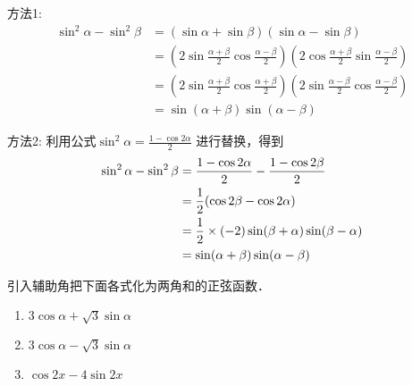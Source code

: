 \begin{solution}
方法1:
\[\begin{split}
    \sin^2\alpha-\sin^2\beta&=(\sin\alpha+\sin\beta)(\sin\alpha-\sin\beta)\\
    &=\left(2\sin\frac{\alpha+\beta}{2}\cos\frac{\alpha-\beta}{2}\right)\left(2\cos\frac{\alpha+\beta}{2}\sin\frac{\alpha-\beta}{2}\right)\\
    &=\left(2\sin\frac{\alpha+\beta}{2}\cos\frac{\alpha+\beta}{2}\right)\left(2\sin\frac{\alpha-\beta}{2}\cos\frac{\alpha-\beta}{2}\right)\\
    &=\sin(\alpha+\beta)\sin(\alpha-\beta)
\end{split}\]

方法2: 利用公式$\sin^2\alpha=\frac{1-\cos2\alpha}{2}$
进行替换，得到
\[\begin{split}
    \sin^2\alpha-\sin^2\beta&=\dfrac{1-\cos2\alpha}{2}-\dfrac{1-\cos2\beta}{2}\\
    &=\dfrac{1}{2}(\cos2\beta-\cos2\alpha)\\
    &=\dfrac{1}{2}\times (-2)\sin(\beta+\alpha)\sin(\beta-\alpha)\\
    &=\sin(\alpha+\beta)\sin(\alpha-\beta)
\end{split}\]
\end{solution}


\begin{example}
    引入辅助角把下面各式化为两角和的正弦函数．
\begin{enumerate}
    \item $3\cos\alpha+\sqrt{3}\sin\alpha$
    \item $3\cos\alpha-\sqrt{3}\sin\alpha$
    \item $\cos 2x-4\sin 2x$
\end{enumerate}
\end{example}

